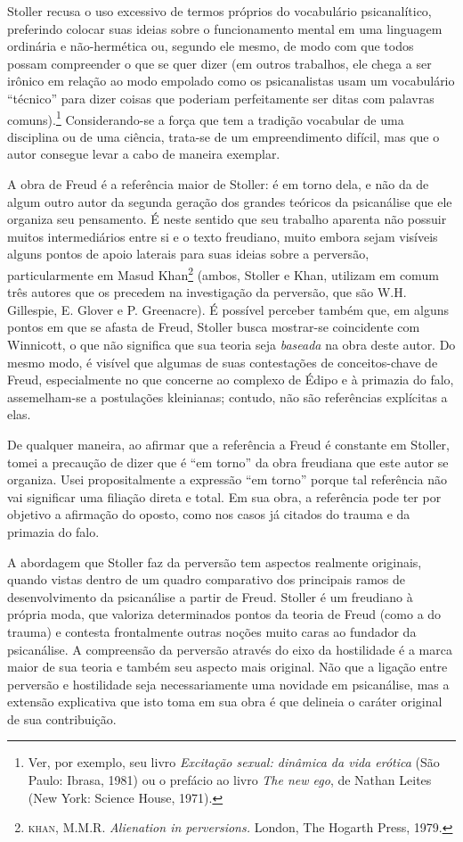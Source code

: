 Stoller recusa o uso excessivo de termos próprios do vocabulário
psicanalítico, preferindo colocar suas ideias sobre o funcionamento
mental em uma linguagem ordinária e não-hermética ou, segundo ele mesmo,
de modo com que todos possam compreender o que se quer dizer (em outros
trabalhos, ele chega a ser irônico em relação ao modo empolado como os
psicanalistas usam um vocabulário ``técnico'' para dizer coisas que
poderiam perfeitamente ser ditas com palavras comuns).\footnote{Ver, por
  exemplo, seu livro \emph{Excitação sexual: dinâmica da vida erótica}
  (São Paulo: Ibrasa, 1981) ou o prefácio ao livro \emph{The new ego},
  de Nathan Leites (New York: Science House, 1971).} Considerando-se a
força que tem a tradição vocabular de uma disciplina ou de uma ciência,
trata-se de um empreendimento difícil, mas que o autor consegue levar a
cabo de maneira exemplar.

A obra de Freud é a referência maior de Stoller: é em torno dela, e não
da de algum outro autor da segunda geração dos grandes teóricos da
psicanálise que ele organiza seu pensamento. É neste sentido que seu
trabalho aparenta não possuir muitos intermediários entre si e o texto
freudiano, muito embora sejam visíveis alguns pontos de apoio laterais
para suas ideias sobre a perversão, particularmente em Masud
Khan\footnote{\textsc{khan}, M.M.R. \emph{Alienation in perversions.}
  London, The Hogarth Press, 1979.} (ambos, Stoller e Khan, utilizam em
comum três autores que os precedem na investigação da perversão, que são
W.H. Gillespie, E. Glover e P. Greenacre). É possível perceber também
que, em alguns pontos em que se afasta de Freud, Stoller busca
mostrar-se coincidente com Winnicott, o que não significa que sua teoria
seja \emph{baseada} na obra deste autor. Do mesmo modo, é visível que
algumas de suas contestações de conceitos-chave de Freud, especialmente
no que concerne ao complexo de Édipo e à primazia do falo, assemelham-se
a postulações kleinianas; contudo, não são referências explícitas a
elas.

De qualquer maneira, ao afirmar que a referência a Freud é constante em
Stoller, tomei a precaução de dizer que é ``em torno'' da obra freudiana
que este autor se organiza. Usei propositalmente a expressão ``em
torno'' porque tal referência não vai significar uma filiação direta e
total. Em sua obra, a referência pode ter por objetivo a afirmação do
oposto, como nos casos já citados do trauma e da primazia do falo.

A abordagem que Stoller faz da perversão tem aspectos realmente
originais, quando vistas dentro de um quadro comparativo dos principais
ramos de desenvolvimento da psicanálise a partir de Freud. Stoller é um
freudiano à própria moda, que valoriza determinados pontos da teoria de
Freud (como a do trauma) e contesta frontalmente outras noções muito
caras ao fundador da psicanálise. A compreensão da perversão através do
eixo da hostilidade é a marca maior de sua teoria e também seu aspecto
mais original. Não que a ligação entre perversão e hostilidade seja
necessariamente uma novidade em psicanálise, mas a extensão explicativa
que isto toma em sua obra é que delineia o caráter original de sua
contribuição.

